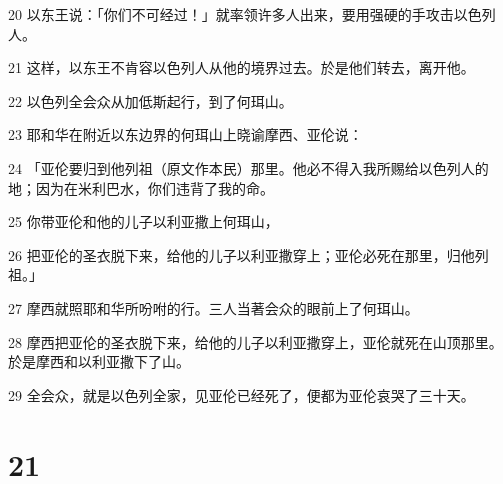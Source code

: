 \par 20 以东王说：「你们不可经过！」就率领许多人出来，要用强硬的手攻击以色列人。
\par 21 这样，以东王不肯容以色列人从他的境界过去。於是他们转去，离开他。
\par 22 以色列全会众从加低斯起行，到了何珥山。
\par 23 耶和华在附近以东边界的何珥山上晓谕摩西、亚伦说：
\par 24 「亚伦要归到他列祖（原文作本民）那里。他必不得入我所赐给以色列人的地；因为在米利巴水，你们违背了我的命。
\par 25 你带亚伦和他的儿子以利亚撒上何珥山，
\par 26 把亚伦的圣衣脱下来，给他的儿子以利亚撒穿上；亚伦必死在那里，归他列祖。」
\par 27 摩西就照耶和华所吩咐的行。三人当著会众的眼前上了何珥山。
\par 28 摩西把亚伦的圣衣脱下来，给他的儿子以利亚撒穿上，亚伦就死在山顶那里。於是摩西和以利亚撒下了山。
\par 29 全会众，就是以色列全家，见亚伦已经死了，便都为亚伦哀哭了三十天。

\chapter{21}

